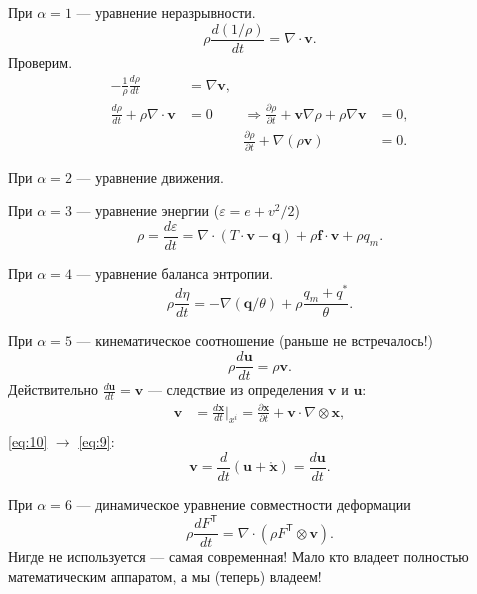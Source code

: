 При $ \alpha = 1 $ --- уравнение неразрывности. 
\[
  \rho \frac{d(1/\rho)}{dt} = \nabla \cdot \mathbf{v}.
\]
Проверим. 
\begin{align*}
  - \frac{1}{\rho} \frac{d\rho}{dt} &= \nabla \mathbf{v},\\
  \frac{d\rho}{dt} + \rho\nabla \cdot \mathbf{v} &= 0 &\Rightarrow \frac{\partial
\rho}{\partial t} + \mathbf{v}\nabla\rho + \rho\nabla\mathbf{v} &= 0,\\
                                                                && \frac{\partial
                                                                \rho}{\partial
                                                                t}
                                                                +\nabla(\rho\mathbf{v})
                                                                &= 0.
\end{align*}



При $ \alpha = 2 $ --- уравнение движения. %

При $ \alpha =3 $ --- уравнение энергии ($ \varepsilon = e + v^2/2$) 
\begin{equation}\label{eq:9}
  \rho = \frac{d \varepsilon}{dt} = \nabla \cdot (T \cdot \mathbf{v} -
  \mathbf{q}) + \rho \mathbf{f} \cdot \mathbf{v} + \rho q_m.
\end{equation}

При $ \alpha = 4 $ --- уравнение баланса энтропии. 
\begin{equation}\label{eq:10}
  \rho \frac{d\eta}{d t} = -\nabla (\mathbf{q}/\theta) + \rho \frac{q_m +
  q^\ast}{\theta}.
\end{equation}

При $ \alpha = 5 $ --- кинематическое соотношение (раньше не встречалось!) 
\[
  \rho \frac{d\mathbf{u}}{dt} = \rho \mathbf{v}.
\]
Действительно $ \frac{d\mathbf{u}}{dt} = \mathbf{v} $ --- следствие из
определения $ \mathbf{v} $ и $ \mathbf{u} $: 
\begin{align*}
  \mathbf{v} &= \frac{d \mathbf{x}}{dt} \big|_{x^i} = \frac{\partial
  \mathbf{x}}{\partial t} + \mathbf{v} \cdot \nabla \otimes \mathbf{x},\\
\end{align*}
\eqref{eq:10} $ \to $ \eqref{eq:9}:
\[
  \mathbf{v} = \frac{d}{dt}(\mathbf{u} + \mathring{\mathbf{x}}) =
  \frac{d\mathbf{u}}{dt}.
\]

При $ \alpha = 6 $ --- динамическое уравнение совместности деформации 
\[
  \rho \frac{dF^{\mathsf T}}{dt} = \nabla\cdot (\rho F^{\mathsf T}\otimes
  \mathbf{v}).
\]
Нигде не используется --- самая современная! Мало кто владеет полностью
математическим аппаратом, а мы (теперь) владеем!

